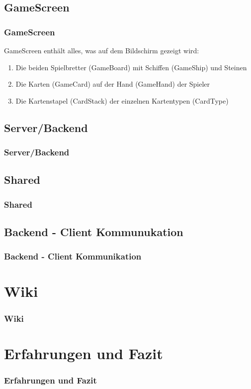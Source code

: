 \documentclass{beamer}
\begin{document}
\subsection{GameScreen}
\begin{frame}
\frametitle{GameScreen}
  GameScreen enthält alles, was auf dem Bildschirm gezeigt wird:
  \begin{enumerate}
    \item Die beiden Spielbretter (GameBoard) mit Schiffen (GameShip) und Steinen
    \item Die Karten (GameCard) auf der Hand (GameHand) der Spieler
    \item Die Kartenstapel (CardStack) der einzelnen Kartentypen (CardType)
  \end{enumerate}
\end{frame}


\subsection{Server/Backend}
\begin{frame}
\frametitle{Server/Backend}
\end{frame}

\subsection{Shared}
\begin{frame}
\frametitle{Shared}
\end{frame}

\subsection{Backend - Client Kommunukation}
\begin{frame}
\frametitle{Backend - Client Kommunikation}
\end{frame}

\section{Wiki}
\begin{frame}
\frametitle{Wiki}

\end{frame}

\section{Erfahrungen und Fazit}
\begin{frame}
\frametitle{Erfahrungen und Fazit}

\end{frame}
\end{document}
